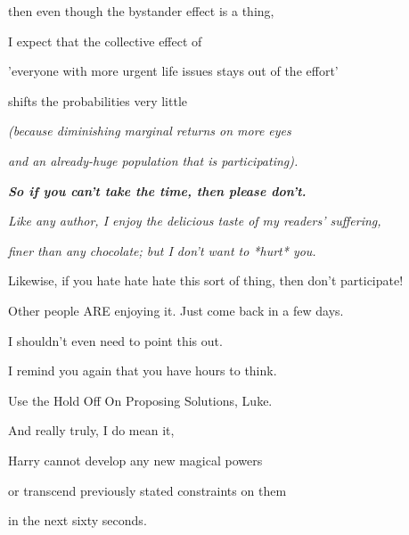 then even though the bystander effect is a thing,

I expect that the collective effect of

'everyone with more urgent life issues stays out of the effort'

shifts the probabilities very little

\emph{(because diminishing marginal returns on more eyes}

\emph{and an already-huge population that is participating).}

\emph{\textbf{So if you can't take the time, then please don't.}}

\emph{Like any author, I enjoy the delicious taste of my readers' suffering,}

\emph{finer than any chocolate; but I don't want to *hurt* you.}

Likewise, if you hate hate hate this sort of thing, then don't participate!

Other people ARE enjoying it. Just come back in a few days.

I shouldn't even need to point this out.

I remind you again that you have hours to think.

Use the Hold Off On Proposing Solutions, Luke.

And really truly, I do mean it,

Harry cannot develop any new magical powers

or transcend previously stated constraints on them

in the next sixty seconds.
